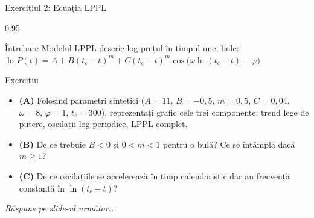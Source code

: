 \documentclass[9pt, aspectratio=169, t]{beamer}
\begin{document}
\begin{frame}{Exercițiul 2: Ecuația LPPL}
    \begin{cminipage}{0.95\textwidth}
    \begin{alertblock}{Întrebare}
        Modelul LPPL descrie log-prețul în timpul unei bule:
        $\ln P(t) = A + B(t_c - t)^m + C(t_c - t)^m \cos\!\bigl(\omega \ln(t_c - t) - \varphi\bigr)$
    \end{alertblock}

    \vspace{0.1cm}

    \begin{block}{Exercițiu}
        \begin{itemize}\setlength{\itemsep}{2pt}
            \item \textcolor{MainBlue}{\textbf{(A)}} Folosind parametri sintetici ($A{=}11$, $B{=}{-}0{,}5$, $m{=}0{,}5$, $C{=}0{,}04$, $\omega{=}8$, $\varphi{=}1$, $t_c{=}300$), reprezentați grafic cele trei componente: trend lege de putere, oscilații log-periodice, LPPL complet.
            \item \textcolor{MainBlue}{\textbf{(B)}} De ce trebuie $B < 0$ și $0 < m < 1$ pentru o bulă? Ce se întâmplă dacă $m \geq 1$?
            \item \textcolor{MainBlue}{\textbf{(C)}} De ce oscilațiile se accelerează în timp calendaristic dar au frecvență constantă în $\ln(t_c - t)$?
        \end{itemize}
    \end{block}

    \vspace{0.1cm}

    \begin{center}
        \textit{Răspuns pe slide-ul următor...}
    \end{center}
    \end{cminipage}
\end{frame}
\end{document}
